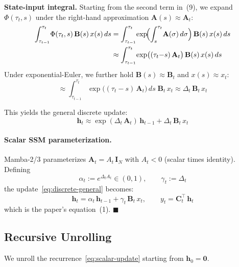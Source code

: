 \documentclass[11pt,a4paper]{article}
\begin{document}
\noindent\textbf{State-input integral.}\quad
Starting from the second term in~(9), we expand $\Phi(\tau_t,s)$ under the right-hand approximation $\mathbf{A}(s)\approx\mathbf{A}_t$:
\begin{align}
  \int_{\tau_{t-1}}^{\tau_t}\!\Phi(\tau_t,s)\,\mathbf{B}(s)\,x(s)\,ds
  &= \int_{\tau_{t-1}}^{\tau_t}\!\exp\!\Bigl(\int_{s}^{\tau_t}\!\mathbf{A}(\sigma)\,d\sigma\Bigr)\,\mathbf{B}(s)\,x(s)\,ds \notag\\
  &\approx \int_{\tau_{t-1}}^{\tau_t}\!\exp\bigl((\tau_t{-}s)\,\mathbf{A}_t\bigr)\,\mathbf{B}(s)\,x(s)\,ds
\end{align}
Under exponential-Euler, we further hold $\mathbf{B}(s)\approx\mathbf{B}_t$ and $x(s)\approx x_t$:
\begin{equation}
  \approx \int_{\tau_{t-1}}^{\tau_t}\!\exp\bigl((\tau_t{-}s)\,\mathbf{A}_t\bigr)\,ds\;\mathbf{B}_t\,x_t
  \approx \Delta_t\,\mathbf{B}_t\,x_t
\end{equation}

This yields the general discrete update:
\begin{equation}\label{eq:discrete-general}
  \mathbf{h}_t \approx \exp(\Delta_t\,\mathbf{A}_t)\,\mathbf{h}_{t-1} + \Delta_t\,\mathbf{B}_t\,x_t
\end{equation}

\paragraph{Scalar SSM parameterization.}\quad
Mamba-2/3 parameterizes $\mathbf{A}_t = A_t\,\mathbf{I}_N$ with $A_t < 0$ (scalar times identity).
Defining
\begin{equation}
  \alpha_t := e^{\Delta_t A_t} \in (0,1), \qquad \gamma_t := \Delta_t
\end{equation}
the update~\eqref{eq:discrete-general} becomes:
\begin{equation}\label{eq:scalar-update}
  \boxed{\;\mathbf{h}_t = \alpha_t\,\mathbf{h}_{t-1} + \gamma_t\,\mathbf{B}_t\,x_t,
  \qquad
  y_t = \mathbf{C}_t^\top\,\mathbf{h}_t\;}
\end{equation}
which is the paper's equation~(1). \hfill$\blacksquare$

\subsection{Recursive Unrolling}\label{sec:unrolling}

We unroll the recurrence~\eqref{eq:scalar-update} starting from $\mathbf{h}_0 = \mathbf{0}$.
\end{document}
